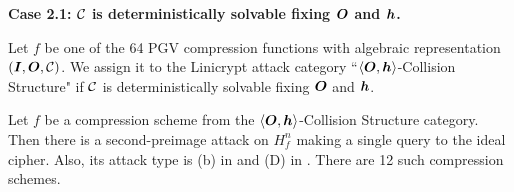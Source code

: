 \textbf{Case 2.1: $\mathcal{C}$ is deterministically solvable fixing $\boldsymbol{O}$ and $\boldsymbol h$.}

\begin{defn}
    Let $f$ be one of the 64 PGV compression functions with algebraic representation $(\boldsymbol{I}, \boldsymbol{O}, \mathcal{C})$.
    We assign it to the Linicrypt attack category ``$\langle\boldsymbol{O}, \boldsymbol h\rangle$-Collision Structure" if
    $\mathcal{C}$ is deterministically solvable fixing $\boldsymbol{O}$ and $\boldsymbol h$.
\end{defn}

\begin{lemma}
    Let $f$ be a compression scheme from the $\langle\boldsymbol{O}, \boldsymbol h\rangle$-Collision Structure category.
    Then there is a second-preimage attack on $H^n_f$ making a single query to the ideal cipher.
    Also, its attack type is (b) in \cite{C:BlaRogShr02} and (D) in \cite{C:PreGovVan93}.
    There are 12 such compression schemes.
\end{lemma}

